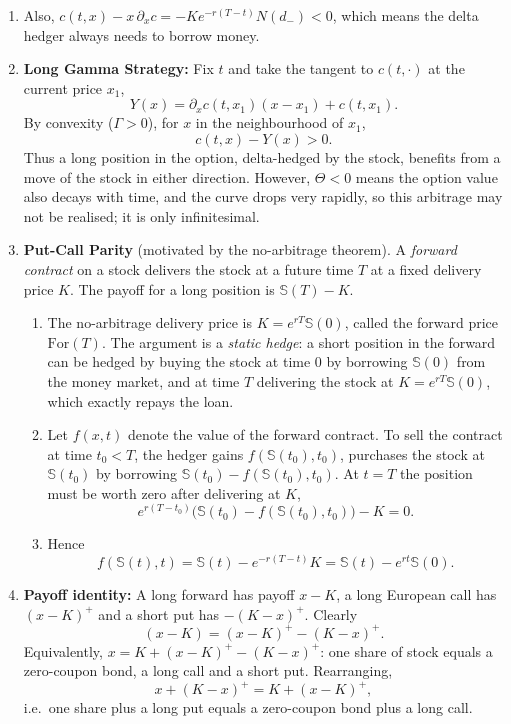 \begin{enumerate}
    \item Also, $c(t, x) - x\,\partial_x c = -Ke^{-r(T-t)}N(d_-) < 0$, which means the delta hedger always needs to borrow money.

    \item \textbf{Long Gamma Strategy:} Fix $t$ and take the tangent to $c(t, \cdot)$ at the current price $x_1$,
    \[Y(x) = \partial_x c(t, x_1)(x - x_1) + c(t, x_1).\]
    By convexity ($\Gamma > 0$), for $x$ in the neighbourhood of $x_1$,
    \[c(t, x) - Y(x) > 0.\]
    Thus a long position in the option, delta-hedged by the stock, benefits from a move of the stock in either direction. However, $\Theta < 0$ means the option value also decays with time, and the curve drops very rapidly, so this arbitrage may not be realised; it is only infinitesimal.

    \item \textbf{Put-Call Parity} (motivated by the no-arbitrage theorem). A \textit{forward contract} on a stock delivers the stock at a future time $T$ at a fixed delivery price $K$. The payoff for a long position is $\mathbb{S}(T) - K$.
    \begin{enumerate}
        \item The no-arbitrage delivery price is $K = e^{rT}\mathbb{S}(0)$, called the forward price $\text{For}(T)$. The argument is a \textit{static hedge}: a short position in the forward can be hedged by buying the stock at time $0$ by borrowing $\mathbb{S}(0)$ from the money market, and at time $T$ delivering the stock at $K = e^{rT}\mathbb{S}(0)$, which exactly repays the loan.
        \item Let $f(x, t)$ denote the value of the forward contract. To sell the contract at time $t_0 < T$, the hedger gains $f(\mathbb{S}(t_0), t_0)$, purchases the stock at $\mathbb{S}(t_0)$ by borrowing $\mathbb{S}(t_0) - f(\mathbb{S}(t_0), t_0)$. At $t = T$ the position must be worth zero after delivering at $K$,
        \[e^{r(T - t_0)}\bigl(\mathbb{S}(t_0) - f(\mathbb{S}(t_0), t_0)\bigr) - K = 0.\]
        \item Hence
        \[f(\mathbb{S}(t), t) = \mathbb{S}(t) - e^{-r(T-t)}K = \mathbb{S}(t) - e^{rt}\mathbb{S}(0).\]
    \end{enumerate}

    \item \textbf{Payoff identity:} A long forward has payoff $x - K$, a long European call has $(x-K)^+$ and a short put has $-(K-x)^+$. Clearly
    \[(x - K) = (x - K)^+ - (K - x)^+.\]
    Equivalently, $x = K + (x-K)^+ - (K-x)^+$: one share of stock equals a zero-coupon bond, a long call and a short put. Rearranging,
    \[x + (K - x)^+ = K + (x - K)^+,\]
    i.e.\ one share plus a long put equals a zero-coupon bond plus a long call.


\end{enumerate}
